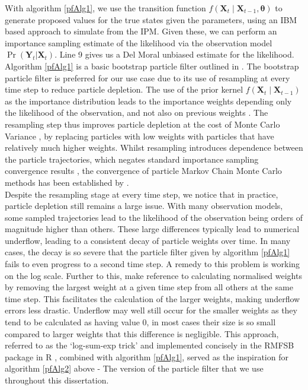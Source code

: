 \documentclass[a4paper,12pt]{article}
\begin{document}
With algorithm \ref{pfAlg1}, we use the transition function $f(\boldsymbol{X}_t \mid \boldsymbol{X}_{t-1}, \boldsymbol{\theta})$ to generate proposed values for the true states given the parameters, using an IBM based approach to simulate from the IPM. Given these, we can perform an importance sampling estimate of the likelihood via the observation model $\Pr(\boldsymbol{Y}_t | \boldsymbol{X}_t)$. Line 9 gives us a Del Moral \citep{DelMoral} unbiased estimate for the likelihood. Algorithm \ref{pfAlg1} is a basic bootstrap particle filter \citep{BootstrapPF} outlined in \citet{Finke}. The bootstrap particle filter is preferred for our use case due to its use of resampling at every time step to reduce particle depletion. The use of the prior kernel $f(\boldsymbol{X}_t \mid \boldsymbol{X}_{t-1})$ as the importance distribution leads to the importance weights depending only the likelihood of the observation, and not also on previous weights \citep{Overview}. The resampling step thus improves particle depletion at the cost of Monte Carlo Variance \citep{Overview}, by replacing particles with low weights with particles that have relatively much higher weights. Whilst resampling introduces dependence between the particle trajectories, which negates standard importance sampling convergence results \citep{Doucet}, the convergence of particle Markov Chain Monte Carlo methods has been established by \citet{Andrieu}.\\




Despite the resampling stage at every time step, we notice that in practice, particle depletion still remains a large issue. With many observation models, some sampled trajectories lead to the likelihood of the observation being orders of magnitude higher than others. These large differences typically lead to numerical underflow, leading to a consistent decay of particle weights over time. In many cases, the decay is so severe that the particle filter given by algorithm \ref{pfAlg1} fails to even progress to a second time step. A remedy to this problem is working on the log scale. Further to this, \citet{Overview} make reference to calculating normalised weights by removing the largest weight at a given time step from all others at the same time step. This facilitates the calculation of the larger weights, making underflow errors less drastic. Underflow may well still occur for the smaller weights as they tend to be calculated as having value 0, in most cases their size is so small compared to larger weights that this difference is negligible. This approach, referred to as the `log-sum-exp trick' and implemented concisely in the RMFSB package in R \citep{RMFSB}, combined with algorithm \ref{pfAlg1}, served as the inspiration for algorithm \ref{pfAlg2} above - The version of the particle filter that we use throughout this dissertation.\\
\end{document}
